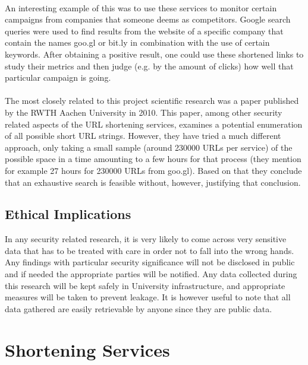 \documentclass[12pt]{article}
\begin{document}
\paragraph{}
 An interesting example of this was to use these services to monitor certain campaigns from companies that someone deems as competitors. Google search queries were used to find results from the website of a specific company that contain the names goo.gl or bit.ly in combination with the use of certain keywords. After obtaining a positive result, one could use these shortened links to study their metrics and then judge (e.g. by the amount of clicks) how well that particular campaign is going.
 
 \paragraph{}
The most closely related to this project scientific research was a paper published by the RWTH Aachen University in 2010. This paper, among other security related aspects of the URL shortening services, examines a potential enumeration of all possible short URL strings. However, they have tried a much different approach, only taking a small sample (around 230000 URLs per service) of the possible space in a time amounting to a few hours for that process (they mention for example 27 hours for 230000 URLs from goo.gl). Based on that they conclude that an exhaustive search is feasible without, however, justifying that conclusion. 

\subsection{Ethical Implications}
In any security related research, it is very likely to come across very sensitive data that has to be treated with care in order not to fall into the wrong hands. Any findings with particular security significance will not be disclosed in public and if needed the appropriate parties will be notified. Any data collected during this research will be kept safely in University infrastructure, and appropriate measures will be taken to prevent leakage. It is however useful to note that all data gathered are easily retrievable by anyone since they are public data.

\newpage

\section{Shortening Services}
\end{document}
